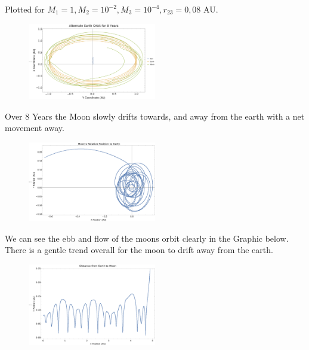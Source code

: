 \documentclass{article}
\begin{document}
Plotted for $M_1 = 1, M_2 = 10^{-2}, M_3 = 10^{-4}, r_{23} = 0,08$ AU. 

\begin{figure}[!htb]
	\begin{center}
		\includegraphics[width=0.5\textwidth]{p1-3a.pdf}
	\end{center}
	\caption{}
\label{fig:qual}
\end{figure}
\FloatBarrier

Over 8 Years the Moon slowly drifts towards, and away from the earth with a net movement away.

\begin{figure}[!htb]
	\begin{center}
		\includegraphics[width=0.5\textwidth]{p1-3b.pdf}
	\end{center}
	\caption{}
\label{fig:qual}
\end{figure}
\FloatBarrier

We can see the ebb and flow of the moons orbit clearly in the Graphic below. There is a gentle trend overall for the moon to drift away from the earth.

\begin{figure}[!htb]
	\begin{center}
		\includegraphics[width=0.5\textwidth]{p1-3c.pdf}
	\end{center}
	\caption{}
\label{fig:qual}
\end{figure}
\FloatBarrier
\end{document}
